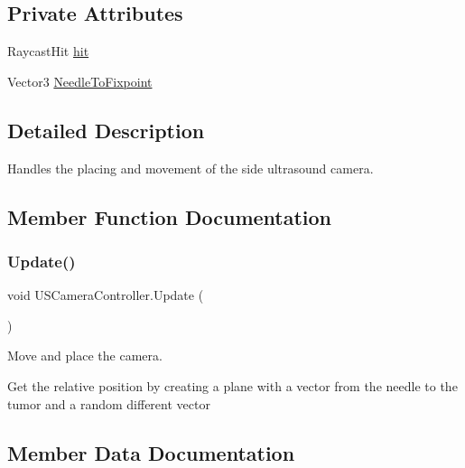 \subsection*{Private Attributes}
\begin{DoxyCompactItemize}
\item 
Raycast\+Hit \mbox{\hyperlink{class_u_s_camera_controller_a940a5a86d9d76540cbad649d35f715a4}{hit}}
\item 
Vector3 \mbox{\hyperlink{class_u_s_camera_controller_a924a3ae2ab38ca9dad322da33fb5770f}{Needle\+To\+Fixpoint}}
\end{DoxyCompactItemize}


\subsection{Detailed Description}
Handles the placing and movement of the side ultrasound camera. 

\subsection{Member Function Documentation}
\mbox{\label{class_u_s_camera_controller_a20fb7ef256409f212446dd6bb7073e7c}} 
\subsubsection{\texorpdfstring{Update()}{Update()}}
{\footnotesize\ttfamily void U\+S\+Camera\+Controller.\+Update (\begin{DoxyParamCaption}{ }\end{DoxyParamCaption})\hspace{0.3cm}{\ttfamily [private]}}



Move and place the camera. 

Get the relative position by creating a plane with a vector from the needle to the tumor and a random different vector 

\subsection{Member Data Documentation}
\mbox{\label{class_u_s_camera_controller_a940a5a86d9d76540cbad649d35f715a4}} 
